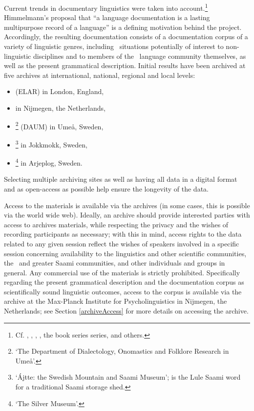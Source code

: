 Current trends in documentary linguistics were taken into account.\footnote{Cf. \citet{BirdSimons2003}, \citet{Gippert2006}, \citet{Woodbury2011}, \citet{AustinSallabank2011}, \citet{GrenobleFurbee2010} the book series  series, and others.} 
Himmelmann’s proposal that “a language documentation is a lasting multipurpose record of a language” \citep[1]{Himmelmann2006a} is a defining motivation behind the project. Accordingly, the resulting documentation consists of a documentation corpus of a variety of linguistic genres, including \PS\ situations potentially of interest to non-linguistic disciplines and to members of the \PS\ language community themselves, as well as the present grammatical description. Initial results have been archived at five archives at international, national, regional and local levels:
\begin{itemize}
\item{ (ELAR) in London, England,}
\item{ in Nijmegen, the Netherlands,}
\item{\footnote{‘The Department of Dialectology, Onomastics and Folklore Research in Umeå’.} (DAUM) in Umeå, Sweden,}
\item{\footnote{‘Ájtte: the Swedish Mountain and Saami Museum’;  is the Lule Saami word for a traditional Saami storage shed.} in Jokkmokk, Sweden,}
\item{\footnote{‘The Silver Museum’.} in Arjeplog, Sweden.}
\end{itemize}
Selecting multiple archiving sites as well as having all data in a digital format and as open-access as possible help ensure the longevity of the data. 

Access to the materials is available via the archives (in some cases, this is possible via the world wide web). %
Ideally, an archive should provide interested parties with access to archives materials, while respecting the privacy and the wishes of recording participants as necessary; with this in mind, access rights to the data related to any given session reflect the wishes of speakers involved in a specific session concerning availability to the linguistics and other scientific communities, the \PS\ and greater Saami communities, and other individuals and groups in general. Any commercial use of the materials is strictly prohibited. Specifically regarding the present grammatical description and the documentation corpus as scientifically sound linguistic outcomes, %
access to the corpus is available via the archive at the Max-Planck Institute for Psycholinguistics in Nijmegen, the Netherlands; see Section \ref{archiveAccess} for more details on accessing the archive. 


